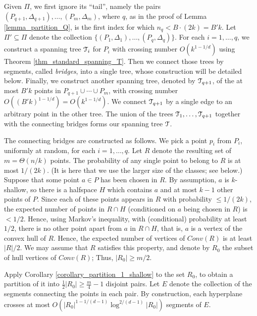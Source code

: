 \documentclass[11pt]{article}
\newcommand{\Tree}{\EuScript{T}}
\begin{document}
Given $\Pi$, we first ignore its ``tail'', namely the pairs $(P_{q+1},\Delta_{q+1}), \ldots, (P_{m}, \Delta_{m})$, where $q$, as in the proof of Lemma \ref{lemma_partition_Q}, is the first index for which $n_{q} < B\cdot(2k) = B'k$. Let $\Pi' \subseteq \Pi$ denote the collection $\{(P_{1},\Delta_{1}),
\ldots, (P_{q},\Delta_{q})\}$. For each $i = 1, \ldots, q$, we construct a spanning tree $\Tree_{i}$ for $P_{i}$ with crossing number $O(k^{1-1/d})$ using Theorem  \ref{thm_standard_spanning_T}. Then we connect those trees by segments, called \emph{bridges}, into a single tree, whose construction will be detailed below. Finally, we construct another spanning tree, denoted by $\Tree_{q+1}$, of the at most $B'k$ points in $P_{q+1}
\cup \cdots \cup P_{m}$, with crossing number $O((B'k)^{1-1/d}) = O(k^{1-1/d})$. We connect $\Tree_{q+1}$ by a single edge to an arbitrary point in the other tree. The union of the trees $\Tree_{1}, \ldots, \Tree_{q+1}$ together with the connecting bridges forms our spanning tree $\Tree$.

The connecting bridges are constructed as follows. We pick a point $p_{i}$ from $P_{i}$, uniformly at random, for each $i=1,\ldots,q$. Let $R$ denote the resulting set of $m = \Theta(n/k)$ points. The probability of any single point to belong to $R$ is at most $1/(2k)$. (It is here that we use the larger size of the classes; see below.) Suppose that some point $a \in P$ has been chosen in $R$. By assumption, $a$ is $k$-shallow, so there is a halfspace $H$ which contains $a$ and at most $k-1$ other points of $P$. Since each of these points appears in $R$ with probability $\leq 1/(2k)$, the expected number of points in $R \cap H$ (conditioned on $a$ being chosen in $R$) is $< 1/2$. Hence, using Markov's inequality, with (conditional) probability at least $1/2$, there is no other point apart from $a$ in $R \cap H$, that is, $a$ is a vertex of the convex hull of $R$. Hence, the expected number of vertices of $Conv(R)$ is at least $|R|/2$. We may assume that $R$ satisfies this property, and denote by $R_{0}$ the subset of hull vertices of $Conv(R)$; Thus, $|R_{0}| \geq m/2$.

Apply Corollary \ref{corollary_partition_1_shallow} to the set $R_{0}$, to obtain a partition of it into $\frac{1}{2}|R_{0}| \geq \frac{m}{4} - 1$ disjoint pairs. Let $E$ denote the collection of the segments connecting the points in each pair. By construction, each hyperplane crosses at most  $O(|R_{0}|^{1-1/(d-1)} \log^{2/(d-1)}|R_{0}|)$ segments of $E$.
\end{document}
